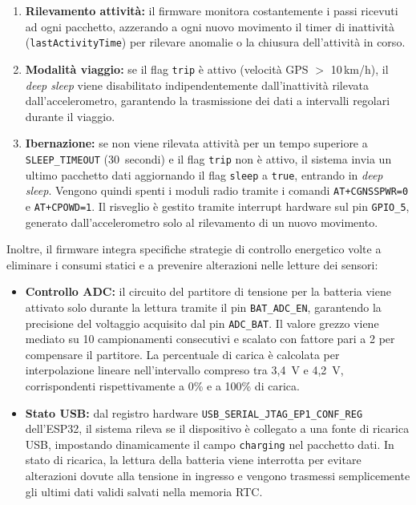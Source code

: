 \documentclass[12pt,a4paper]{article}
\begin{document}
\begin{enumerate}
    \item \textbf{Rilevamento attività:} il firmware monitora costantemente i passi ricevuti ad ogni pacchetto,
          azzerando a ogni nuovo movimento il timer di inattività (\texttt{lastActivityTime}) per rilevare anomalie o la chiusura dell'attività in corso.
    \item \textbf{Modalità viaggio:} se il flag \texttt{trip} è attivo (velocità GPS $>$ 10\,km/h), 
          il \textit{deep sleep} viene disabilitato indipendentemente dall'inattività rilevata
          dall'accelerometro, garantendo la trasmissione dei dati a intervalli regolari durante il viaggio.
    \item \textbf{Ibernazione:} se non viene rilevata attività per un tempo superiore a
          \texttt{SLEEP\_TIMEOUT} (30~secondi) e il flag \texttt{trip} non è attivo, il sistema
          invia un ultimo pacchetto dati aggiornando il flag \texttt{sleep} a \texttt{true}, entrando in \textit{deep sleep}. 
          Vengono quindi spenti i moduli radio tramite i comandi \texttt{AT+CGNSSPWR=0} e \texttt{AT+CPOWD=1}. Il risveglio
          è gestito tramite interrupt hardware sul pin \texttt{GPIO\_5}, generato dall'accelerometro
          solo al rilevamento di un nuovo movimento.
\end{enumerate}

Inoltre, il firmware integra specifiche strategie di controllo energetico 
volte a eliminare i consumi statici e a prevenire alterazioni nelle letture dei sensori:

\begin{itemize}
    \item \textbf{Controllo ADC:} il circuito del partitore di tensione per la batteria viene
          attivato solo durante la lettura tramite il pin \texttt{BAT\_ADC\_EN}, garantendo la
          precisione del voltaggio acquisito dal pin \texttt{ADC\_BAT}. Il valore grezzo viene
          mediato su 10 campionamenti consecutivi e scalato con fattore pari a 2 per compensare il partitore. 
          La percentuale di carica è calcolata per interpolazione lineare
          nell'intervallo compreso tra 3,4~V e 4,2~V,
          corrispondenti rispettivamente a 0\% e a 100\% di carica.
    \item \textbf{Stato USB:} dal registro hardware \texttt{USB\_SERIAL\_JTAG\_\allowbreak EP1\_CONF\_REG} dell'ESP32, 
          il sistema rileva se il dispositivo è collegato a una fonte di ricarica USB, impostando
          dinamicamente il campo \texttt{charging} nel pacchetto dati. In stato di ricarica,
          la lettura della batteria viene interrotta per evitare alterazioni dovute alla tensione 
          in ingresso e vengono trasmessi semplicemente gli ultimi dati validi salvati nella memoria RTC.
\end{itemize}
\end{document}
